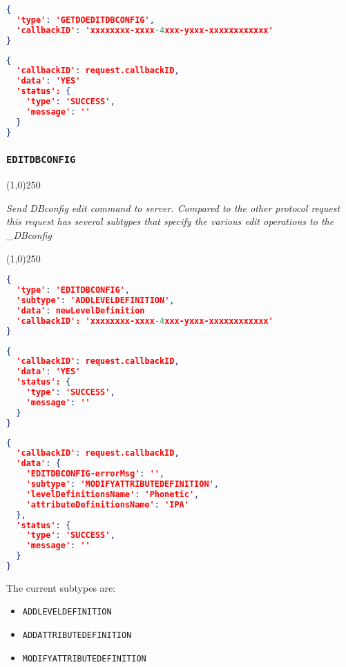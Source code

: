 \documentclass[A4,12pt, utf8]{article}
\begin{document}
\begin{lstlisting}[caption=Request content, language=json]
{
  'type': 'GETDOEDITDBCONFIG', 
  'callbackID': 'xxxxxxxx-xxxx-4xxx-yxxx-xxxxxxxxxxxx'
}
\end{lstlisting}

\begin{lstlisting}[caption=response content, language=json]
{
  'callbackID': request.callbackID,
  'data': 'YES'
  'status': {
    'type': 'SUCCESS',
    'message': ''
  }
}
\end{lstlisting}


\subsubsection{\texttt{EDITDBCONFIG}}
\label{EDITDBCONFIG}
\begin{center}
  \line(1,0){250}

  \textit{Send DBconfig edit command to server. Compared to the other protocol 
  request this request has several subtypes that specify the various edit operations
  to the \_DBconfig }

  \line(1,0){250}
\end{center}


\begin{lstlisting}[caption=Request content, language=json]
{
  'type': 'EDITDBCONFIG',
  'subtype': 'ADDLEVELDEFINITION', 
  'data': newLevelDefinition
  'callbackID': 'xxxxxxxx-xxxx-4xxx-yxxx-xxxxxxxxxxxx'
}
\end{lstlisting}

\begin{lstlisting}[caption=response content (if changes could be applied to DB), language=json]
{
  'callbackID': request.callbackID,
  'data': 'YES'
  'status': {
    'type': 'SUCCESS',
    'message': ''
  }
}
\end{lstlisting}

\begin{lstlisting}[caption=response content (if changes could NOT be applied to DB), language=json]
{
  'callbackID': request.callbackID,
  'data': {
    'EDITDBCONFIG-errorMsg': '',
    'subtype': 'MODIFYATTRIBUTEDEFINITION',
    'levelDefinitionsName': 'Phonetic',
    'attributeDefinitionsName': 'IPA'
  },
  'status': {
    'type': 'SUCCESS',
    'message': ''
  }
}
\end{lstlisting}


The current subtypes are: 

\begin{itemize}
  \item \texttt{ADDLEVELDEFINITION}
  \item \texttt{ADDATTRIBUTEDEFINITION}
  \item \texttt{MODIFYATTRIBUTEDEFINITION}
\end{itemize}
\end{document}
